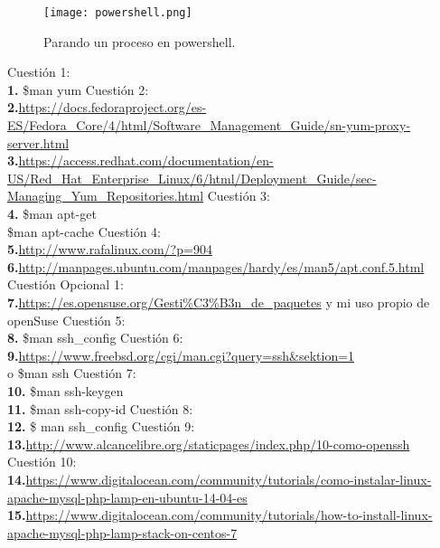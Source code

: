 \documentclass[a4paper, 11pt]{article} %
\begin{document}
\begin{figure}[h]
\centering 
\texttt{[image: powershell.png]} 
\caption{Parando un proceso en powershell.} 
\vspace{-0.5cm}
\label{contexto:figura} 
\end{figure}


\pagebreak


\begin{thebibliography}{X}
 Cuestión 1:\\ 
 \textbf{1.} \$man yum
 Cuestión 2:\\ 
 \textbf{2.}\url{https://docs.fedoraproject.org/es-ES/Fedora_Core/4/html/Software_Management_Guide/sn-yum-proxy-server.html}\\
 \textbf{3.}\url{https://access.redhat.com/documentation/en-US/Red_Hat_Enterprise_Linux/6/html/Deployment_Guide/sec-Managing_Yum_Repositories.html}
   Cuestión 3:\\ 
 \textbf{4.} \$man apt-get \\
             \$man apt-cache
   Cuestión 4:\\ 
  \textbf{5.}\url{http://www.rafalinux.com/?p=904}\\
  \textbf{6.}\url{http://manpages.ubuntu.com/manpages/hardy/es/man5/apt.conf.5.html}
   Cuestión Opcional 1:\\ 
  \textbf{7.}\url{https://es.opensuse.org/Gesti\%C3\%B3n_de_paquetes} y mi uso propio de openSuse
  Cuestión 5:\\ 
 \textbf{8.} \$man ssh\_config
   Cuestión 6:\\ 
 \textbf{9.}\url{https://www.freebsd.org/cgi/man.cgi?query=ssh&sektion=1} \\o \$man ssh
     Cuestión 7:\\ 
  \textbf{10.} \$man ssh-keygen \\
  \textbf{11.} \$man ssh-copy-id
   Cuestión 8:\\ 
 \textbf{12.} \$ man ssh\_config
 Cuestión 9:\\ 
 \textbf{13.}\url{http://www.alcancelibre.org/staticpages/index.php/10-como-openssh}\\
  Cuestión 10:\\ 
 \textbf{14.}\url{https://www.digitalocean.com/community/tutorials/como-instalar-linux-apache-mysql-php-lamp-en-ubuntu-14-04-es}\\
 \textbf{15.}\url{https://www.digitalocean.com/community/tutorials/how-to-install-linux-apache-mysql-php-lamp-stack-on-centos-7}

\end{thebibliography}
\end{document}
